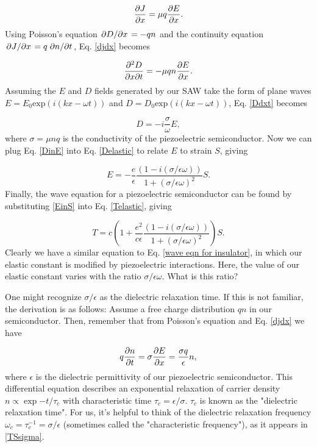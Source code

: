 \documentclass[double,12pt,1in]{beavtex}
\begin{document}
\begin{equation}
    \pdv{J}{x} = \mu q \pdv{E}{x}. \label{djdx}
\end{equation}
Using Poisson's equation $\pdv*{D}{x} = -qn$ and the continuity equation $\pdv*{J}{x} = q \pdv*{n}{t}$, Eq. \ref{djdx} becomes

\begin{equation}
    \pdv{D}{x}{t} = -\mu q n \pdv{E}{x}. \label{Ddxt}
\end{equation}
Assuming the $E$ and $D$ fields generated by our SAW take the form of plane waves $E = E_0 \mathrm{exp}(i(kx - \omega t))$ and $D = D_0 \mathrm{exp}(i(kx - \omega t))$, Eq. \ref{Ddxt} becomes

\begin{equation}
    D = -i\frac{\sigma}{\omega} E, \label{DinE}
\end{equation}
where $\sigma = \mu n q$ is the conductivity of the piezoelectric semiconductor. Now we can plug Eq. \ref{DinE} into Eq. \ref{Delastic} to relate $E$ to strain $S$, giving

\begin{equation}
    E = -\frac{e}{\epsilon}\frac{(1-i(\sigma/\epsilon\omega))}{1+(\sigma/\epsilon\omega)^2}S. \label{EinS}
\end{equation}
Finally, the wave equation for a piezoelectric semiconductor can be found by substituting \ref{EinS} into Eq. \ref{Telastic}, giving

\begin{equation}
    T = c(1 + \frac{e^2}{c\epsilon}\frac{(1-i(\sigma/\epsilon\omega))}{1+(\sigma/\epsilon\omega)^2})S. \label{TSsigma}
\end{equation}
Clearly we have a similar equation to Eq. \ref{wave eqn for insulator}, in which our elastic constant is modified by piezoelectric interactions. Here, the value of our elastic constant varies with the ratio $\sigma/\epsilon\omega$. What is this ratio?

One might recognize $\sigma/\epsilon$ as the dielectric relaxation time. If this is not familiar, the derivation is as follows: Assume a free charge distribution $qn$ in our semiconductor. Then, remember that from Poisson's equation and Eq. \ref{djdx} we have

\begin{equation}
    q\pdv{n}{t} = \sigma\pdv{E}{x} = \frac{\sigma q}{\epsilon}n, 
\end{equation}
where $\epsilon$ is the dielectric permittivity of our piezoelectric semiconductor. This differential equation describes an exponential relaxation of carrier density $n \propto \exp{-t/\tau_c}$ with characteristic time $\tau_c = \epsilon/\sigma$. $\tau_c$ is known as the "dielectric relaxation time". For us, it's helpful to think of the dielectric relaxation frequency $\omega_c = \tau_c^{-1} = \sigma/\epsilon$ (sometimes called the "characteristic frequency"), as it appears in \ref{TSsigma}. 
\end{document}
